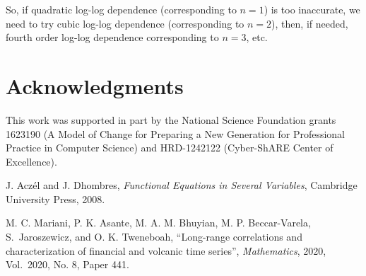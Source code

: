 \documentclass{article}
\begin{document}
 So, if quadratic log-log dependence (corresponding to $n=1$) is too inaccurate, we need to try cubic log-log dependence (corresponding to $n=2$), then, if needed, fourth order log-log dependence corresponding to $n=3$, etc.

\section*{Acknowledgments}

This work was supported in part by the National Science Foundation
grants 1623190 (A Model of Change for Preparing a New Generation
for Professional Practice in Computer Science) and HRD-1242122
(Cyber-ShARE Center of Excellence).

\begin{thebibliography}{9}

J. Acz\'el and J. Dhombres, {\it Functional Equations in Several
Variables}, Cambridge University Press, 2008.

 M. C. Mariani, P. K. Asante, M. A. M. Bhuyian, M. P. Beccar-Varela, S.~Jaroszewicz, and O. K. Tweneboah,
``Long-range correlations and characterization of financial and volcanic time series'', {\it Mathematics}, 2020, Vol.~2020,
No. 8, Paper 441.

\end{thebibliography}
\end{document}
